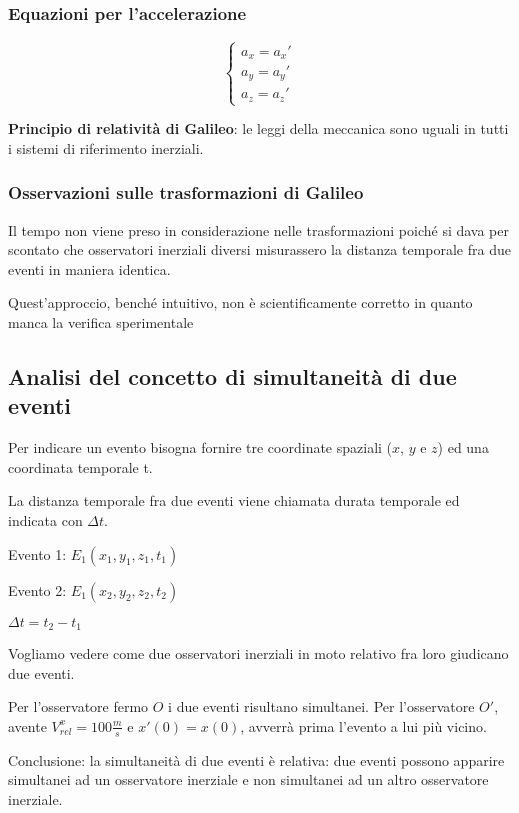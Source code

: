         \subsubsection{Equazioni per l'accelerazione}
        \begin{equation}
            \begin{cases}
            a_x = a_x'\\
            a_y = a_y'\\
            a_z = a_z'
            \end{cases}
        \end{equation}
        \par \textbf{Principio di relatività di Galileo}: le leggi della meccanica sono uguali in tutti i sistemi di riferimento inerziali.
        \subsubsection{Osservazioni sulle trasformazioni di Galileo}
        \par Il tempo non viene preso in considerazione nelle trasformazioni poiché si dava per scontato che osservatori inerziali diversi misurassero la distanza temporale fra due eventi in maniera identica.
        \par Quest'approccio, benché intuitivo, non è scientificamente corretto in quanto manca la verifica sperimentale
    \subsection{Analisi del concetto di simultaneità di due eventi}
        \par Per indicare un evento bisogna fornire tre coordinate spaziali ($x$, $y$ e $z$) ed una coordinata temporale t.
        \par La distanza temporale fra due eventi viene chiamata durata temporale ed indicata con ${\Delta}t$.
        \par \esempio
        \par Evento 1: $E_1(x_1,y_1,z_1,t_1)$
        \par Evento 2: $E_1(x_2,y_2,z_2,t_2)$
        \par ${\Delta}t = t_2-t_1$
        \par Vogliamo vedere come due osservatori inerziali in moto relativo fra loro giudicano due eventi.
        \par Per l'osservatore fermo $O$ i due eventi risultano simultanei. Per l'osservatore $O'$, avente $V_{rel}^x=100 \frac{m}{s}$ e $x'(0)=x(0)$, avverrà prima l'evento a lui più vicino.
        \par Conclusione: la simultaneità di due eventi è relativa: due eventi possono apparire simultanei ad un osservatore inerziale e non simultanei ad un altro osservatore inerziale.
